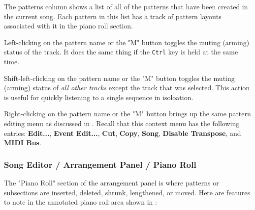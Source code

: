    The patterns column shows a list of all of the patterns that have been
   created in the current song.  Each pattern in this list has a track of
   pattern layouts associated with it in the piano roll section.

   Left-clicking on the pattern name or the "M" button toggles the muting
   (arming) status of the track.
   It does the same thing if the \texttt{Ctrl} key is held at the same time.

   Shift-left-clicking on the pattern name or the "M" button toggles the muting
   (arming) status of \textsl{all other tracks} except the track that was
   selected.  This action is useful for quickly listening to a single sequence
   in isoloation.

   Right-clicking on the pattern name or the "M" button brings up the same
   pattern editing menu as discussed in
   .
   Recall that this context menu has the following entries:
   \textbf{Edit...}, \textbf{Event Edit...}, \textbf{Cut}, \textbf{Copy},
   \textbf{Song}, \textbf{Disable Transpose}, and \textbf{MIDI Bus}.

\subsubsection{Song Editor / Arrangement Panel / Piano Roll}
\label{subsubsec:seq64_song_editor_arrangement_panel_roll}

   The "Piano Roll" section of the arrangement panel is where patterns or
   subsections are inserted, deleted, shrunk, lengthened, or moved.
   Here are features to note in the annotated piano roll area
   shown in :

